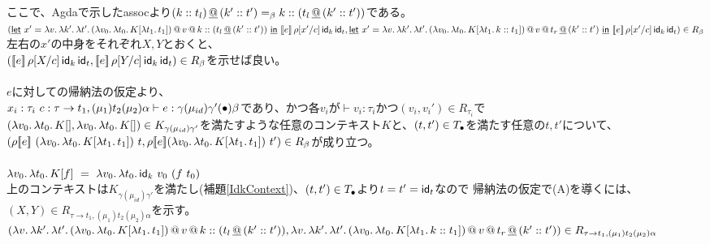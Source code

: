 ここで、Agdaで示した\textsf{assoc}より$\DAppend{\ConsP{k}{t_l}}{\ConsP{k'}{t'}} =_{\beta} \Cons{k}{(\DAppend{t_l}{\ConsP{k'}{t'}}})$である。\\
$(\DLet{x'}
      {\Lam{v}{\Lam{k'}{\Lam{t'}
        {\App{\App{\LamP{v_0}{\Lam{t_0}{K[\Lam{t_1}{t_1}]}}}{v}}{\Cons{k}{(\DAppend{t_l}{\ConsP{k'}{t'}}})}}}}}
      {\CPS{e}{\rho[\Change{c}{x'}]}{\Idk}{\Idt}},\\
   \DLet{x'}
      {\Lam{v}{\Lam{k'}{\Lam{t'}
        {\App{\App{\LamP{v_0}{\Lam{t_0}{K[\Lam{t_1}{\Cons{k}{t_1}}]}}}{v}}{\DAppend{t_r}{\ConsP{k'}{t'}}}}}}}
      {\CPS{e}{\rho[\Change{c}{x'}]}{\Idk}{\Idt}})
      \in R_{\beta}$\\
      左右の$x'$の中身をそれぞれ$X,Y$とおくと、\\
      $(\CPS{e}{\rho[\Change{c}{X}]}{\Idk}{\Idt},\CPS{e}{\rho[\Change{c}{Y}]}{\Idk}{\Idt})\in R_{\beta}$を示せば良い。\\
\\
$e$に対しての帰納法の仮定より、\\
$x_i:\tau_i\ c:\tau \rightarrow t_1, (\mu_1) t_2 (\mu_2) \alpha \vdash e : \gamma (\mu_{id}) \gamma' (\Bullet) \beta$であり、かつ各$v_i$が$\vdash v_i:\tau_i$かつ$(v_i,v_i') \in R_{\tau_i}$で\\
$(\Lam{v_0}{\Lam{t_0}{K[]}}, \Lam{v_0}{\Lam{t_0}{K[]}})\in  K_{\gamma (\mu_{id}) \gamma'}$を満たすような任意のコンテキスト$K$と、$(t, t') \in T_{\Bullet}$を満たす任意の$t, t'$について、\\
$(\rho \CPSTh{e}\ \LamP{v_0}{\Lam{t_0}{K[\Lam{t_1}{t_1}]}}\ t, \rho \CPSTh{e} \LamP{v_0}{\Lam{t_0}{K[\Lam{t_1}{t_1}]}}\ t')\in R_{\beta}$が成り立つ。\\
\\
$\Lam{v_0}{\Lam{t_0}{K[f]}}\ =\ \Lam{v_0}{\Lam{t_0}{\Idk\ v_0\ (f\ t_0)}}$\\
上のコンテキストは$K_{\gamma (\mu_{id}) \gamma'}$を満たし(補題\ref{IdkContext})、$(t, t') \in T_{\Bullet}$より$t=t'=\Idt$なので
帰納法の仮定で(A)を導くには、$(X,Y)\in R_{\tau \rightarrow t_1, (\mu_1) t_2 (\mu_2) \alpha}$を示す。\\
$(\Lam{v}{\Lam{k'}{\Lam{t'}
    {\App{\App{\LamP{v_0}{\Lam{t_0}{K[\Lam{t_1}{t_1}]}}}{v}}{\Cons{k}{(\DAppend{t_l}{\ConsP{k'}{t'}}})}}}},\\
  \Lam{v}{\Lam{k'}{\Lam{t'}
      {\App{\App{\LamP{v_0}{\Lam{t_0}{K[\Lam{t_1}{\Cons{k}{t_1}}]}}}{v}}{\DAppend{t_r}{\ConsP{k'}{t'}}}}}})\in R_{\tau \rightarrow t_1, (\mu_1) t_2 (\mu_2) \alpha}$\\
\\
